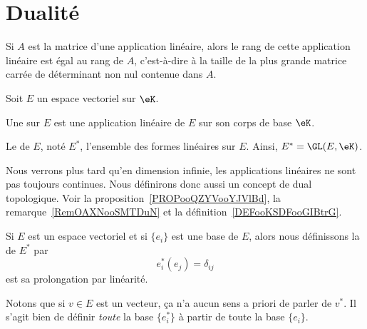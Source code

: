 \section{Dualité}

\begin{proposition} \label{PropEJBZooTNFPRj}
    Si \( A\) est la matrice d'une application linéaire, alors le rang de cette application linéaire est égal au rang de \( A \), c'est-à-dire à la taille de la plus grande matrice carrée de déterminant non nul contenue dans \( A\).
\end{proposition}

\begin{definition}  \label{DefJPGSHpn}
    Soit \( E\) un espace vectoriel sur \( \eK\).

    Une  sur \( E \) est une application linéaire de \( E \) sur son corps de base \( \eK\).

    Le  de \( E\), noté \( E^*\), l'ensemble des formes linéaires sur \( E\). Ainsi, \( E^* = \GL(E,\eK)\).
\end{definition}

Nous verrons plus tard qu'en dimension infinie, les applications linéaires ne sont pas toujours continues. Nous définirons donc aussi un concept de dual topologique. Voir la proposition~\ref{PROPooQZYVooYJVlBd}, la remarque~\ref{RemOAXNooSMTDuN} et la définition~\ref{DEFooKSDFooGIBtrG}.

\begin{definition}      \label{DEFooTMSEooZFtsqa}
    Si \( E\) est un espace vectoriel et si \( \{ e_i \}\) est une base de \( E\), alors nous définissons la  de \( E^*\) par
    \begin{equation}
        e_i^*(e_j)=\delta_{ij}
    \end{equation}
    est sa prolongation par linéarité.
\end{definition}
Notons que si \( v\in E\) est un vecteur, ça n'a aucun sens a priori de parler de \( v^*\). Il s'agit bien de définir \emph{toute} la base \( \{ e_i^* \}\) à partir de toute la base \( \{ e_i \}\).

